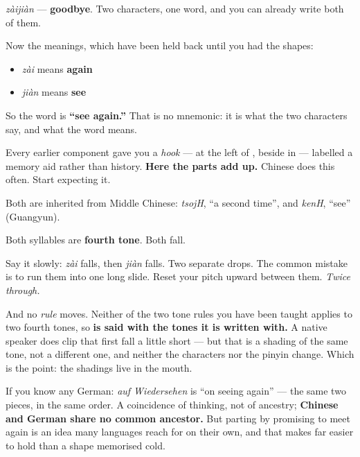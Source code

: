 \begin{cousinweb}
\begin{quote}
\end{quote}

\textbf{} \emph{zàijiàn} — \textbf{goodbye}. Two characters, one word, and you can already write both of them.

Now the meanings, which have been held back until you had the shapes:

\begin{itemize}
\raggedright
  \item \textbf{} \emph{zài} means \textbf{again}
  \item \textbf{} \emph{jiàn} means \textbf{see}
\end{itemize}

So the word is \textbf{\textquotedblleft{}see again.\textquotedblright{}} That is no mnemonic: it is what the two characters say, and what the word means.

Every earlier component gave you a \emph{hook} —  at the left of ,  beside  in  — labelled a memory aid rather than history. \textbf{Here the parts add up.} Chinese does this often. Start expecting it.

Both are inherited from Middle Chinese: \emph{tsojH}, \textquotedblleft{}a second time\textquotedblright{}, and \emph{kenH}, \textquotedblleft{}see\textquotedblright{} (Guangyun).
\end{cousinweb}

\begin{sounds}
Both syllables are \textbf{fourth tone}. Both fall.

Say it slowly: \emph{zài} falls, then \emph{jiàn} falls. Two separate drops. The common mistake is to run them into one long slide. Reset your pitch upward between them. \emph{Twice through.}

And no \emph{rule} moves. Neither of the two tone rules you have been taught applies to two fourth tones, so \textbf{ is said with the tones it is written with.} A native speaker does clip that first fall a little short — but that is a shading of the same tone, not a different one, and neither the characters nor the pinyin change. Which is the point: the shadings live in the mouth.
\end{sounds}

\begin{culture}
If you know any German: \emph{auf Wiedersehen} is \textquotedblleft{}on seeing again\textquotedblright{} — the same two pieces, in the same order. A coincidence of thinking, not of ancestry; \textbf{Chinese and German share no common ancestor.} But parting by promising to meet again is an idea many languages reach for on their own, and that makes  far easier to hold than a shape memorised cold.
\end{culture}

